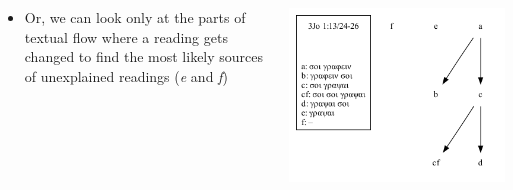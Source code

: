 \documentclass[10pt]{beamer}
\begin{document}
	\begin{frame}
		\begin{columns}
			\begin{column}{0.45\textwidth}
				\begin{itemize}
					\item Or, we can look only at the parts of textual flow where a reading gets changed to find the most likely sources of unexplained readings (\emph{e} and \emph{f})
				\end{itemize}
			\end{column}
			\begin{column}{0.45\textwidth}
				\begin{center}
					\includegraphics[width=\textwidth]{../img/B25K1V13U24-26-local-stemma-incomplete.pdf}
				\end{center}
			\end{column}
		\end{columns}
	\end{frame}
\end{document}
